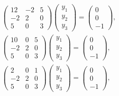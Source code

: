 \documentclass[12pt]{article}
\begin{document}
    \begin{gather*}
        \begin{pmatrix}
            12 & -2 & 5 \\
            -2 & 2  & 0 \\
            5  & 0  & 3
        \end{pmatrix}
        \begin{pmatrix}
            y_1 \\
            y_2 \\
            y_3
        \end{pmatrix}
        =
        \begin{pmatrix}
            0 \\
            0 \\
            -1
        \end{pmatrix}, \\
        \begin{pmatrix}
            10 & 0 & 5 \\
            -2 & 2 & 0 \\
            5  & 0 & 3
        \end{pmatrix}
        \begin{pmatrix}
            y_1 \\
            y_2 \\
            y_3
        \end{pmatrix}
        =
        \begin{pmatrix}
            0 \\
            0 \\
            -1
        \end{pmatrix}, \\
        \begin{pmatrix}
            2  & 0 & 1 \\
            -2 & 2 & 0 \\
            5  & 0 & 3
        \end{pmatrix}
        \begin{pmatrix}
            y_1 \\
            y_2 \\
            y_3
        \end{pmatrix}
        =
        \begin{pmatrix}
            0 \\
            0 \\
            -1
        \end{pmatrix}, \\

\end{gather*}
\end{document}
